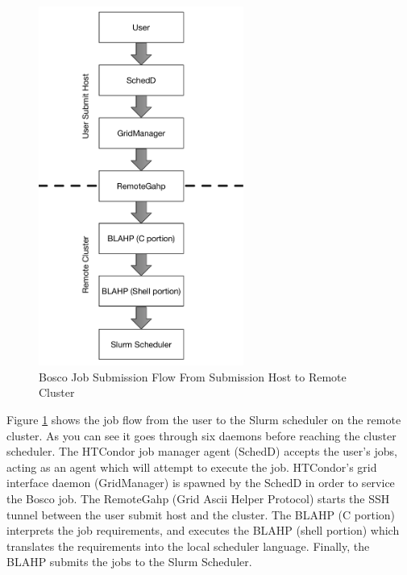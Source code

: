 \begin{figure}[h!t]
	\centering
	\includegraphics[width=0.6\textwidth]{images/JobSubmitFlow.pdf}
	\caption{Bosco Job Submission Flow From Submission Host to Remote Cluster}
	\label{fig:boscojobsubmitflow}
\end{figure}

Figure \ref{fig:boscojobsubmitflow} shows the job flow from the user to the Slurm scheduler on the remote cluster.  As you can see it goes through six daemons before reaching the cluster scheduler.  The HTCondor job manager agent (SchedD) accepts the user's jobs, acting as an agent which will attempt to execute the job.  HTCondor's grid interface daemon (GridManager) is spawned by the SchedD in order to service the Bosco job.  The RemoteGahp (Grid Ascii Helper Protocol) starts the SSH tunnel between the user submit host and the cluster.  The BLAHP (C portion) interprets the job requirements, and executes the BLAHP (shell portion) which translates the requirements into the local scheduler language.  Finally, the BLAHP submits the jobs to the Slurm Scheduler.

\pagebreak

